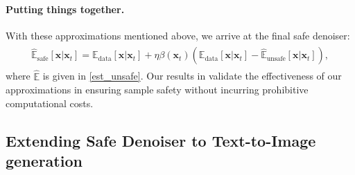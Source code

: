 \paragraph{Putting things together.}
With these approximations mentioned above, we arrive at the final safe denoiser:
\begin{align}\label{eq:uncond_safe}
\begin{split}
   \hat{\mathbb{E}}_{\text{safe}}[\mathbf{x}\vert\mathbf{x}_{t}] = \mathbb{E}_{\text{data}}[\mathbf{x}\vert\mathbf{x}_{t}]
+ \eta\beta(\mathbf{x}_{t})(\mathbb{E}_{\text{data}}[\mathbf{x}\vert\mathbf{x}_{t}]-\hat{\mathbb{E}}_{\text{unsafe}}[\mathbf{x}\vert\mathbf{x}_{t}]),
\end{split}
\end{align}
where $\hat{\mathbb{E}}$ is given in \eqref{est_unsafe}. 
%
Our results in  validate the effectiveness of our approximations in ensuring sample safety without incurring prohibitive computational costs.
%

%

%
%
%
%
%
%



%
%
%
%
%
%

%

%

%

\subsection{Extending Safe Denoiser to Text-to-Image generation}

